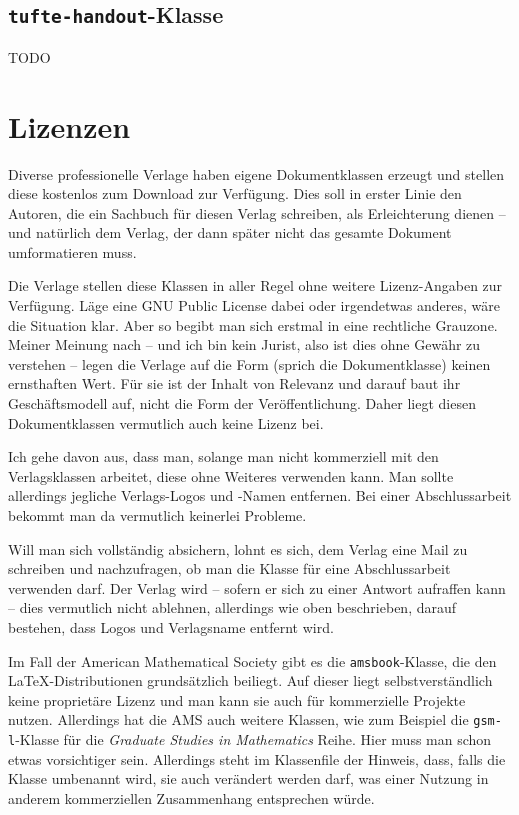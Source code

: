\subsection{\texttt{tufte-handout}-Klasse}
TODO


\section{Lizenzen}

Diverse professionelle Verlage haben eigene Dokumentklassen erzeugt und stellen diese kostenlos zum Download zur Verfügung. Dies soll in erster Linie den Autoren, die ein Sachbuch für diesen Verlag schreiben, als Erleichterung dienen -- und natürlich dem Verlag, der dann später nicht das gesamte Dokument umformatieren muss. 

Die Verlage stellen diese Klassen in aller Regel ohne weitere Lizenz-An\-ga\-ben zur Verfügung. Läge eine GNU Public License dabei oder irgendetwas anderes, wäre die Situation klar. Aber so begibt man sich erstmal in eine rechtliche Grauzone. Meiner Meinung nach -- und ich bin kein Jurist, also ist dies ohne Gewähr zu verstehen -- legen die Verlage auf die Form (sprich die Dokumentklasse) keinen ernsthaften Wert. Für sie ist der Inhalt von Relevanz und darauf baut ihr Geschäftsmodell auf, nicht die Form der Veröffentlichung. Daher liegt diesen Dokumentklassen vermutlich auch keine Lizenz bei. 

Ich gehe davon aus, dass man, solange man nicht kommerziell mit den Verlagsklassen arbeitet, diese ohne Weiteres verwenden kann. Man sollte allerdings jegliche Verlags-Logos und -Namen entfernen. Bei einer Abschlussarbeit bekommt man da vermutlich keinerlei Probleme.

Will man sich vollständig absichern, lohnt es sich, dem Verlag eine Mail zu schreiben und nachzufragen, ob man die Klasse für eine Abschlussarbeit verwenden darf. Der Verlag wird -- sofern er sich zu einer Antwort aufraffen kann -- dies vermutlich nicht ablehnen, allerdings wie oben beschrieben, darauf bestehen, dass Logos und Verlagsname entfernt wird. 

Im Fall der American Mathematical Society gibt es die \texttt{amsbook}-Klasse, die den \LaTeX-Distributionen grundsätzlich beiliegt. Auf dieser liegt selbstverständlich keine proprietäre Lizenz und man kann sie auch für kommerzielle Projekte nutzen. Allerdings hat die AMS auch weitere Klassen, wie zum Beispiel die \texttt{gsm-l}-Klasse für die \textsl{Graduate Studies in Mathematics} Reihe. Hier muss man schon etwas vorsichtiger sein. Allerdings steht im Klassenfile der Hinweis, dass, falls die Klasse umbenannt wird, sie auch verändert werden darf, was einer Nutzung in anderem kommerziellen Zusammenhang entsprechen würde. 

